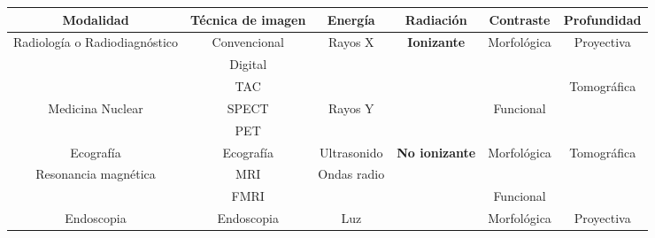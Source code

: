 \begin{tabular}{|c|c|c|c|c|c|}
\hline
\textbf{Modalidad}                             & \textbf{Técnica de imagen} & \textbf{Energía}             & \textbf{Radiación}                     & \textbf{Contraste}           & \textbf{Profundidad}         \\ \hline
\multirow{3}{*}{Radiología o Radiodiagnóstico} & Convencional               & \multirow{3}{*}{Rayos X}     & \multirow{5}{*}{\textbf{Ionizante}}    & \multirow{3}{*}{Morfológica} & \multirow{2}{*}{Proyectiva}  \\ \cline{2-2}
                                               & Digital                    &                              &                                        &                              &                              \\ \cline{2-2} \cline{6-6} 
                                               & TAC                        &                              &                                        &                              & \multirow{3}{*}{Tomográfica} \\ \cline{1-3} \cline{5-5}
\multirow{2}{*}{Medicina Nuclear}              & SPECT                      & \multirow{2}{*}{Rayos Y}     &                                        & \multirow{2}{*}{Funcional}   &                              \\ \cline{2-2}
                                               & PET                        &                              &                                        &                              &                              \\ \hline
Ecografía                                      & Ecografía                  & Ultrasonido                  & \multirow{4}{*}{\textbf{No ionizante}} & \multirow{2}{*}{Morfológica} & \multirow{3}{*}{Tomográfica} \\ \cline{1-3}
\multirow{2}{*}{Resonancia magnética}          & MRI                        & \multirow{2}{*}{Ondas radio} &                                        &                              &                              \\ \cline{2-2} \cline{5-5}
                                               & FMRI                       &                              &                                        & Funcional                    &                              \\ \cline{1-3} \cline{5-6} 
Endoscopia                                     & Endoscopia                 & Luz                          &                                        & Morfológica                  & Proyectiva                   \\ \hline
\end{tabular}
